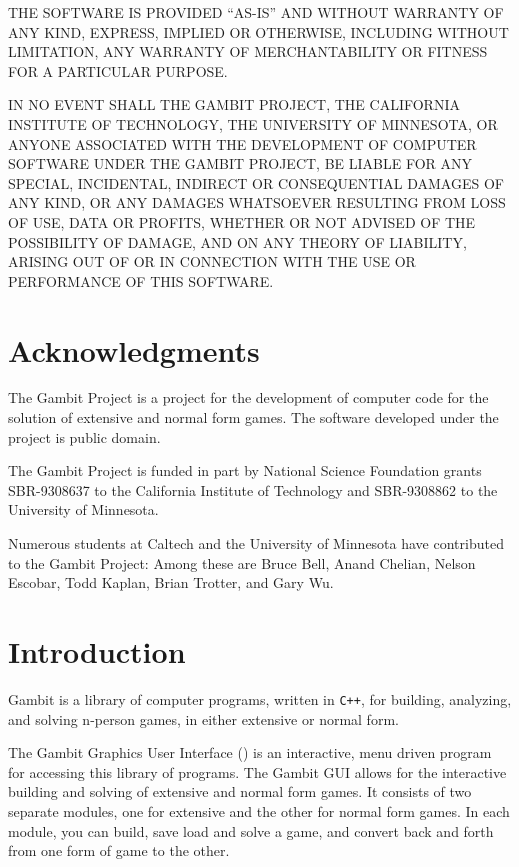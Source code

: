 THE SOFTWARE IS PROVIDED ``AS-IS'' AND WITHOUT WARRANTY OF ANY KIND, EXPRESS, IMPLIED OR 
OTHERWISE, INCLUDING WITHOUT LIMITATION, ANY WARRANTY OF MERCHANTABILITY OR FITNESS FOR A 
PARTICULAR PURPOSE.
 
IN NO EVENT SHALL THE GAMBIT PROJECT, THE CALIFORNIA INSTITUTE OF TECHNOLOGY, THE UNIVERSITY 
OF MINNESOTA, OR ANYONE ASSOCIATED WITH THE DEVELOPMENT OF COMPUTER SOFTWARE UNDER THE GAMBIT 
PROJECT, BE LIABLE FOR ANY SPECIAL, INCIDENTAL, INDIRECT OR CONSEQUENTIAL DAMAGES OF ANY KIND, 
OR ANY DAMAGES WHATSOEVER RESULTING FROM LOSS OF USE, DATA OR PROFITS, WHETHER OR NOT ADVISED 
OF THE POSSIBILITY OF DAMAGE, AND ON ANY THEORY OF LIABILITY, ARISING OUT OF OR IN CONNECTION 
WITH THE USE OR PERFORMANCE OF THIS SOFTWARE.


\chapter*{Acknowledgments}%

The Gambit Project is a project for the development of computer code for the 
solution of extensive and normal form games.  The software developed under 
the project is public domain.  

The Gambit Project is funded in part by 
National Science Foundation grants SBR-9308637 to the California Institute 
of Technology and SBR-9308862 to the University of Minnesota.  

Numerous students at Caltech and the University of Minnesota have contributed
 to the Gambit Project:  Among these are Bruce Bell,  Anand Chelian, Nelson 
Escobar, Todd Kaplan, Brian Trotter, and Gary Wu. 

\chapter{Introduction} 

Gambit is a library of computer programs, written
in \verb$C++$, for building, analyzing, and solving n-person games, in
either extensive or normal form.

The Gambit Graphics User Interface () is an
interactive, menu driven program for accessing this library of programs.
The Gambit GUI allows for the interactive building and solving of
extensive and normal form games.  It consists of two separate modules, one
for extensive and the other for normal form games.   In each module, you
can build, save load and solve a game, and convert back and forth from one
form of game to the other.

